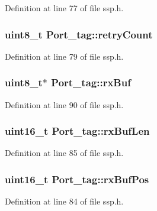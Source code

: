 Definition at line 77 of file ssp.\-h.

\hypertarget{struct_port__tag_a4b402cb1f1f50b59c0da70bdecaab4c2}{
\subsubsection[{retry\-Count}]{\setlength{\rightskip}{0pt plus 5cm}uint8\-\_\-t Port\-\_\-tag\-::retry\-Count}}\label{struct_port__tag_a4b402cb1f1f50b59c0da70bdecaab4c2}


Definition at line 79 of file ssp.\-h.

\hypertarget{struct_port__tag_a6443695333cf60025e806731fbeb3ffa}{
\subsubsection[{rx\-Buf}]{\setlength{\rightskip}{0pt plus 5cm}uint8\-\_\-t$\ast$ Port\-\_\-tag\-::rx\-Buf}}\label{struct_port__tag_a6443695333cf60025e806731fbeb3ffa}


Definition at line 90 of file ssp.\-h.

\hypertarget{struct_port__tag_a2b8635d420232bc0f5d790760d65e34e}{
\subsubsection[{rx\-Buf\-Len}]{\setlength{\rightskip}{0pt plus 5cm}uint16\-\_\-t Port\-\_\-tag\-::rx\-Buf\-Len}}\label{struct_port__tag_a2b8635d420232bc0f5d790760d65e34e}


Definition at line 85 of file ssp.\-h.

\hypertarget{struct_port__tag_a65be5575b4a5f28bf7c8ccfd855f3020}{
\subsubsection[{rx\-Buf\-Pos}]{\setlength{\rightskip}{0pt plus 5cm}uint16\-\_\-t Port\-\_\-tag\-::rx\-Buf\-Pos}}\label{struct_port__tag_a65be5575b4a5f28bf7c8ccfd855f3020}


Definition at line 84 of file ssp.\-h.

